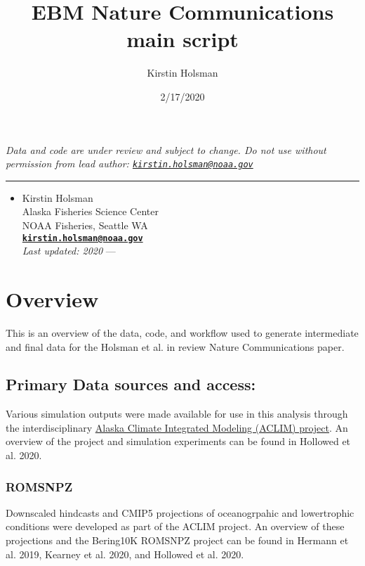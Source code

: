 \documentclass[]{article}
\title{EBM Nature Communications main script}
\author{Kirstin Holsman}
\date{2/17/2020}
\providecommand{\tightlist}{%
  \setlength{\itemsep}{0pt}\setlength{\parskip}{0pt}}
\begin{document}
\maketitle

\emph{Data and code are under review and subject to change. Do not use
without permission from lead author:
\href{mailto:kirstin.holsman@noaa.gov}{\nolinkurl{kirstin.holsman@noaa.gov}}}

\begin{center}\rule{0.5\linewidth}{0.5pt}\end{center}

\begin{itemize}
\tightlist
\item
  Kirstin Holsman\\
  Alaska Fisheries Science Center\\
  NOAA Fisheries, Seattle WA\\
  \textbf{\href{mailto:kirstin.holsman@noaa.gov}{\nolinkurl{kirstin.holsman@noaa.gov}}}\\
  \emph{Last updated: 2020} ---
\end{itemize}

\section{Overview}\label{overview}

This is an overview of the data, code, and workflow used to generate
intermediate and final data for the Holsman et al. in review Nature
Communications paper.

\subsection{Primary Data sources and
access:}\label{primary-data-sources-and-access}

Various simulation outputs were made available for use in this analysis
through the interdisciplinary
\href{\%22https://www.fisheries.noaa.gov/alaska/ecosystems/alaska-climate-integrated-modeling-project\%22}{Alaska
Climate Integrated Modeling (ACLIM) project}. An overview of the project
and simulation experiments can be found in Hollowed et al. 2020.

\subsubsection{ROMSNPZ}\label{romsnpz}

Downscaled hindcasts and CMIP5 projections of oceanogrpahic and
lowertrophic conditions were developed as part of the ACLIM project. An
overview of these projections and the Bering10K ROMSNPZ project can be
found in Hermann et al. 2019, Kearney et al. 2020, and Hollowed et al.
2020.
\end{document}
